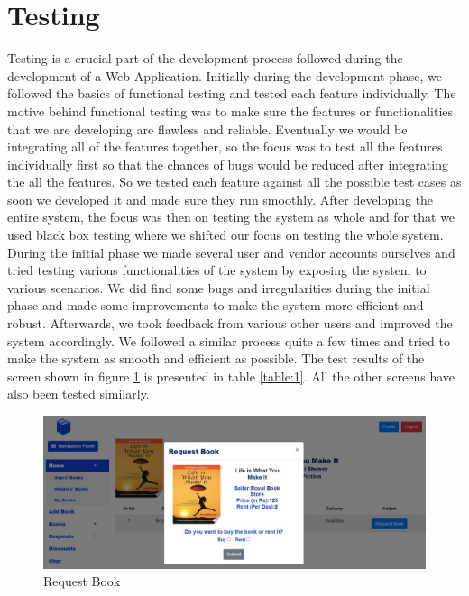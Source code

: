 \documentclass[conference]{IEEEtran}
\begin{document}
\section{Testing}
Testing is a crucial part of the development process followed during the development of a Web Application. Initially during the development phase, we followed the basics of functional testing and tested each feature individually. The motive behind functional testing was to make sure the features or functionalities that we are developing are flawless and reliable. Eventually we would be integrating all of the features together, so the focus was to test all the features individually first so that the chances of bugs would be reduced after integrating the all the features. So we tested each feature against all the possible test cases as soon we developed it and made sure they run smoothly. After developing the entire system, the focus was then on testing the system as whole and for that we used black box testing where we shifted our focus on testing the whole system. During the initial phase we made several user and vendor accounts ourselves and tried testing various functionalities of the system by exposing the system to various scenarios. We did find some bugs and irregularities during the initial phase and made some improvements to make the system more efficient and robust. Afterwards, we took feedback from various other users and improved the system accordingly. We followed a similar process quite a few times and tried to make the system as smooth and efficient as possible. The test results of the screen shown in figure \ref{fig:requestbookfeature} is presented in table \ref{table:1}. All the other screens have also been tested similarly.

\begin{figure}[H]
     \centering
     \includegraphics[scale=0.23,margin=2,frame]{testing.JPG}
     \caption{Request Book}
     \label{fig:requestbookfeature}
 \end{figure}
\end{document}
